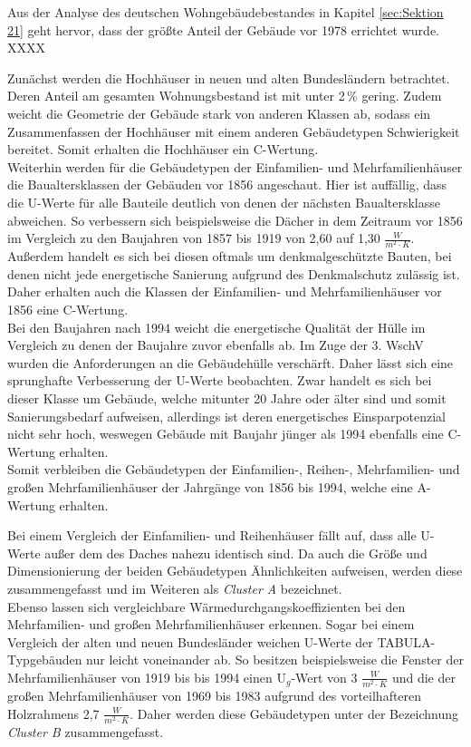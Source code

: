 Aus der Analyse des deutschen Wohngebäudebestandes in Kapitel \ref{sec:Sektion 21} geht hervor, dass der größte Anteil der Gebäude vor 1978 errichtet wurde.
XXXX


Zunächst werden die Hochhäuser in neuen und alten Bundesländern betrachtet. 
Deren Anteil am gesamten Wohnungsbestand ist mit unter 2\,\% gering.
Zudem weicht die Geometrie der Gebäude stark von anderen Klassen ab, sodass ein Zusammenfassen der Hochhäuser mit einem anderen Gebäudetypen  Schwierigkeit bereitet.
Somit erhalten die Hochhäuser ein C-Wertung.\\
Weiterhin werden für die Gebäudetypen der Einfamilien- und Mehrfamilienhäuser die Baualtersklassen der Gebäuden vor 1856 angeschaut.
Hier ist auffällig, dass die U-Werte für alle Bauteile deutlich von denen der nächsten Baualtersklasse abweichen.
So verbessern sich beispielsweise die Dächer in dem Zeitraum vor 1856 im Vergleich zu den Baujahren von 1857 bis 1919 von 2,60 auf 1,30 \(\frac{W}{m^2 \cdot K}\).
Außerdem handelt es sich bei diesen oftmals um denkmalgeschützte Bauten, bei denen nicht jede energetische Sanierung aufgrund des Denkmalschutz zulässig ist.
Daher erhalten auch die Klassen der Einfamilien- und Mehrfamilienhäuser vor 1856 eine C-Wertung.\\
Bei den Baujahren nach 1994 weicht die energetische Qualität der Hülle im Vergleich zu denen der Baujahre zuvor ebenfalls ab.
Im Zuge der 3. WschV wurden die Anforderungen an die Gebäudehülle verschärft.
Daher lässt sich eine sprunghafte Verbesserung der U-Werte beobachten.
Zwar handelt es sich bei dieser Klasse um Gebäude, welche mitunter 20 Jahre  oder älter sind und somit Sanierungsbedarf aufweisen, allerdings ist deren energetisches Einsparpotenzial nicht sehr hoch, weswegen Gebäude mit Baujahr jünger als 1994 ebenfalls eine C-Wertung erhalten.\\
Somit verbleiben die Gebäudetypen der Einfamilien-, Reihen-, Mehrfamilien- und großen Mehrfamilienhäuser der Jahrgänge von 1856 bis 1994, welche eine A-Wertung erhalten.

Bei einem Vergleich der Einfamilien- und Reihenhäuser fällt auf, dass alle U-Werte außer dem des Daches nahezu identisch sind.
Da auch die Größe und Dimensionierung der beiden Gebäudetypen Ähnlichkeiten aufweisen, werden diese zusammengefasst und im Weiteren als \textit{Cluster A} bezeichnet.\\
Ebenso lassen sich vergleichbare Wärmedurchgangskoeffizienten bei den Mehrfamilien- und großen Mehrfamilienhäuser erkennen.
Sogar bei einem Vergleich der alten und neuen Bundesländer weichen U-Werte der TABULA-Typgebäuden nur leicht voneinander ab.
So besitzen beispielsweise die Fenster der Mehrfamilienhäuser von 1919 bis bis 1994 einen U\(_g\)-Wert von 3 \(\frac{W}{m^2 \cdot K}\) und die der großen Mehrfamilienhäuser von 1969 bis 1983 aufgrund des vorteilhafteren Holzrahmens 2,7 \(\frac{W}{m^2 \cdot K}\).
Daher werden diese Gebäudetypen unter der Bezeichnung \textit{Cluster B} zusammengefasst.

